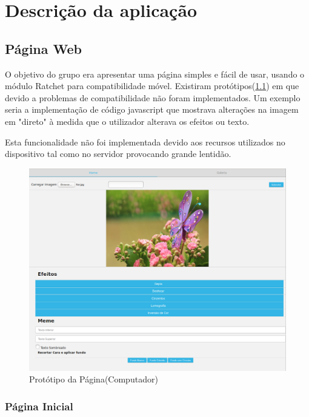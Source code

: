 \documentclass{report}
\begin{document}
\chapter{Descrição da aplicação}
\label{chap.desc}

\section{Página Web}

O objetivo do grupo era apresentar uma página simples e fácil de usar, usando o módulo Ratchet para compatibilidade móvel. Existiram protótipos(\ref{ProtPag}) em que devido a problemas de compatibilidade não foram implementados. Um exemplo seria a implementação de código javascript que mostrava alterações na imagem em "direto" à medida que o utilizador alterava os efeitos ou texto. 

Esta funcionalidade não foi implementada devido aos recursos utilizados no dispositivo tal como no servidor provocando grande lentidão.
\begin{figure}[b]
 \center
 \includegraphics[scale=0.5]{prototype.png}
 \caption{Protótipo da Página(Computador)}
 \label{ProtPag}
\end{figure}



\subsection{Página Inicial}
\end{document}
